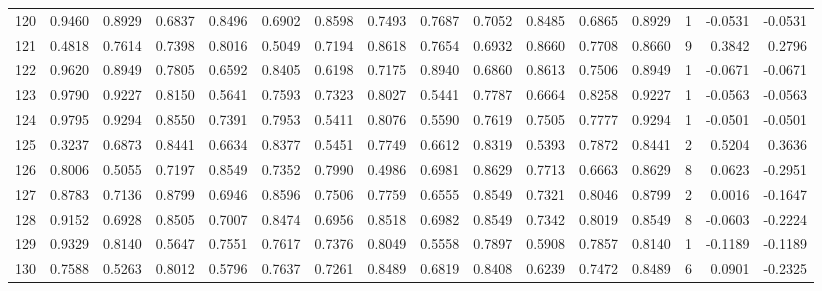 \begin{tabular}{lrrrrrrrrrrrrrrr}
120 &      0.9460 &  0.8929 &  0.6837 &  0.8496 &  0.6902 &  0.8598 &  0.7493 &  0.7687 &  0.7052 &  0.8485 &   0.6865 &     0.8929 &      1 &                   -0.0531 &                    -0.0531 \\
121 &      0.4818 &  0.7614 &  0.7398 &  0.8016 &  0.5049 &  0.7194 &  0.8618 &  0.7654 &  0.6932 &  0.8660 &   0.7708 &     0.8660 &      9 &                    0.3842 &                     0.2796 \\
122 &      0.9620 &  0.8949 &  0.7805 &  0.6592 &  0.8405 &  0.6198 &  0.7175 &  0.8940 &  0.6860 &  0.8613 &   0.7506 &     0.8949 &      1 &                   -0.0671 &                    -0.0671 \\
123 &      0.9790 &  0.9227 &  0.8150 &  0.5641 &  0.7593 &  0.7323 &  0.8027 &  0.5441 &  0.7787 &  0.6664 &   0.8258 &     0.9227 &      1 &                   -0.0563 &                    -0.0563 \\
124 &      0.9795 &  0.9294 &  0.8550 &  0.7391 &  0.7953 &  0.5411 &  0.8076 &  0.5590 &  0.7619 &  0.7505 &   0.7777 &     0.9294 &      1 &                   -0.0501 &                    -0.0501 \\
125 &      0.3237 &  0.6873 &  0.8441 &  0.6634 &  0.8377 &  0.5451 &  0.7749 &  0.6612 &  0.8319 &  0.5393 &   0.7872 &     0.8441 &      2 &                    0.5204 &                     0.3636 \\
126 &      0.8006 &  0.5055 &  0.7197 &  0.8549 &  0.7352 &  0.7990 &  0.4986 &  0.6981 &  0.8629 &  0.7713 &   0.6663 &     0.8629 &      8 &                    0.0623 &                    -0.2951 \\
127 &      0.8783 &  0.7136 &  0.8799 &  0.6946 &  0.8596 &  0.7506 &  0.7759 &  0.6555 &  0.8549 &  0.7321 &   0.8046 &     0.8799 &      2 &                    0.0016 &                    -0.1647 \\
128 &      0.9152 &  0.6928 &  0.8505 &  0.7007 &  0.8474 &  0.6956 &  0.8518 &  0.6982 &  0.8549 &  0.7342 &   0.8019 &     0.8549 &      8 &                   -0.0603 &                    -0.2224 \\
129 &      0.9329 &  0.8140 &  0.5647 &  0.7551 &  0.7617 &  0.7376 &  0.8049 &  0.5558 &  0.7897 &  0.5908 &   0.7857 &     0.8140 &      1 &                   -0.1189 &                    -0.1189 \\
130 &      0.7588 &  0.5263 &  0.8012 &  0.5796 &  0.7637 &  0.7261 &  0.8489 &  0.6819 &  0.8408 &  0.6239 &   0.7472 &     0.8489 &      6 &                    0.0901 &                    -0.2325 \\

\end{tabular}
